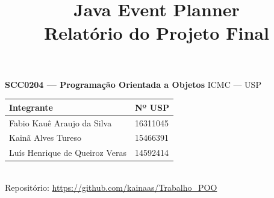 \documentclass[10pt,a4paper]{article}
\title{\vspace{-1.0cm}\textbf{Java Event Planner} \\[1mm]
\large Relatório do Projeto Final}
\author{}
\date{}
\begin{document}
\maketitle
\vspace{-1.4cm}

\begin{center}
\textbf{SCC0204 — Programação Orientada a Objetos} \quad ICMC — USP \\[1mm]
\begin{tabular}{ll}
\toprule
\textbf{Integrante} & \textbf{Nº USP} \\
\midrule
Fabio Kauê Araujo da Silva & 16311045 \\
Kainã Alves Tureso & 15466391 \\
Luís Henrique de Queiroz Veras & 14592414 \\
\bottomrule
\end{tabular} \\[1mm]
Repositório: \url{https://github.com/kainaas/Trabalho_POO}
\end{center}

\end{document}
